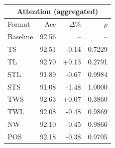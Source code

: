 \begin{tabular}{lrrr}
\toprule
\multicolumn{4}{c}{\textbf{Attention (aggregated)}} \\
\midrule
Format & Acc & $\Delta$\% & $p$ \\
\midrule
Baseline & 92.56 & -- & -- \\
\midrule
TS & 92.51 & -0.14 & 0.7229 \\
TL & 92.70 & +0.13 & 0.2791 \\
STL & 91.89 & -0.67 & 0.9984 \\
STS & 91.08 & -1.48 & 1.0000 \\
TWS & 92.63 & +0.07 & 0.3860 \\
TWL & 92.08 & -0.48 & 0.9869 \\
NW & 92.10 & -0.45 & 0.9866 \\
POS & 92.18 & -0.38 & 0.9705 \\
\bottomrule
\end{tabular}